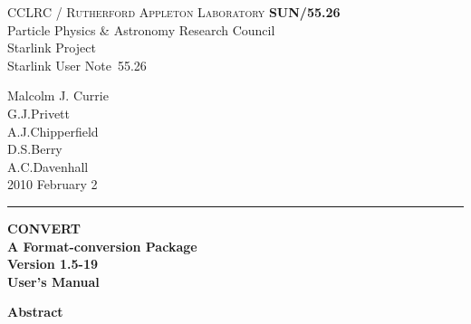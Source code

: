 \documentclass[twoside,11pt]{article}
\newcommand{\stardoccategory}  {Starlink User Note}
\newcommand{\stardocinitials}  {SUN}
\newcommand{\stardocnumber}    {55.26}
\newcommand{\stardocauthors}   {Malcolm J. Currie\\
                                G.J.Privett\\
                                A.J.Chipperfield\\
                                D.S.Berry\\
                                A.C.Davenhall}
\newcommand{\stardocdate}      {2010 February 2}
\newcommand{\stardoctitle}     {CONVERT\\
                                A Format-conversion Package}
\newcommand{\stardocversion}   {Version 1.5-19}
\newcommand{\stardocmanual}    {User's Manual}
\newcommand{\stardocname}{\stardocinitials /\stardocnumber}
\newenvironment{latexonly}{}{}
\begin{document}
\thispagestyle{empty}

\begin{latexonly}
   CCLRC / \textsc{Rutherford Appleton Laboratory} \hfill \textbf{\stardocname}\\
   {\large Particle Physics \& Astronomy Research Council}\\
   {\large Starlink Project\\}
   {\large \stardoccategory\ \stardocnumber}
   \begin{flushright}
   \stardocauthors\\
   \stardocdate
   \end{flushright}
   \vspace{-4mm}
   \rule{\textwidth}{0.5mm}
   \vspace{5mm}
   \begin{center}
   {\Huge\textbf{\stardoctitle \\ [2.5ex]}}
   {\LARGE\textbf{\stardocversion \\ [4ex]}}
   {\Huge\textbf{\stardocmanual}}
   \end{center}
   \vspace{5mm}


   \vspace{10mm}
   \begin{center}
      {\Large\textbf{Abstract}}
   \end{center}
\end{latexonly}
\end{document}
